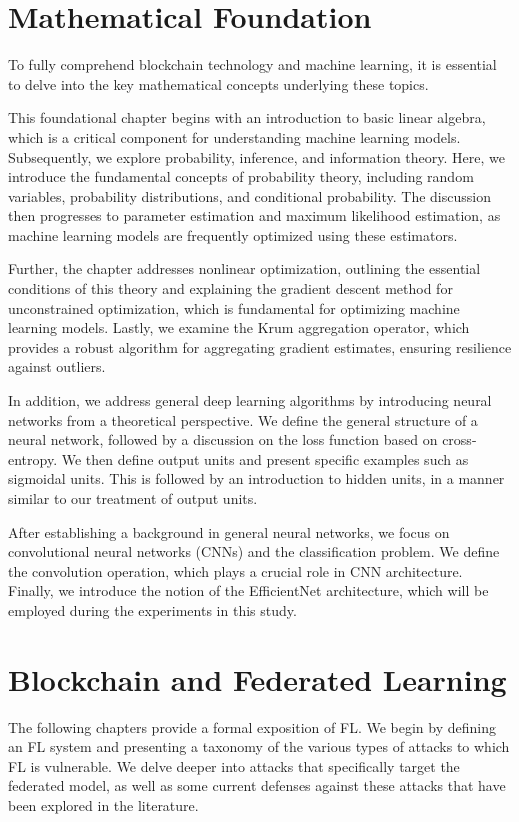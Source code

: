 \section*{Mathematical Foundation}
To fully comprehend blockchain technology and machine learning, it is essential to delve into the key mathematical concepts underlying these topics.

This foundational chapter begins with an introduction to basic linear algebra, which is a critical component for understanding machine learning models. Subsequently, we explore probability, inference, and information theory. Here, we introduce the fundamental concepts of probability theory, including random variables, probability distributions, and conditional probability. The discussion then progresses to parameter estimation and maximum likelihood estimation, as machine learning models are frequently optimized using these estimators.

Further, the chapter addresses nonlinear optimization, outlining the essential conditions of this theory and explaining the gradient descent method for unconstrained optimization, which is fundamental for optimizing machine learning models. Lastly, we examine the Krum aggregation operator, which provides a robust algorithm for aggregating gradient estimates, ensuring resilience against outliers.

In addition, we address general deep learning algorithms by introducing neural networks from a theoretical perspective. We define the general structure of a neural network, followed by a discussion on the loss function based on cross-entropy. We then define output units and present specific examples such as sigmoidal units. This is followed by an introduction to hidden units, in a manner similar to our treatment of output units.

After establishing a background in general neural networks, we focus on convolutional neural networks (CNNs) and the classification problem. We define the convolution operation, which plays a crucial role in CNN architecture. Finally, we introduce the notion of the EfficientNet architecture, which will be employed during the experiments in this study.

\section*{Blockchain and Federated Learning}
The following chapters provide a formal exposition of FL. We begin by defining an FL system and presenting a taxonomy of the various types of attacks to which FL is vulnerable. We delve deeper into attacks that specifically target the federated model, as well as some current defenses against these attacks that have been explored in the literature.

